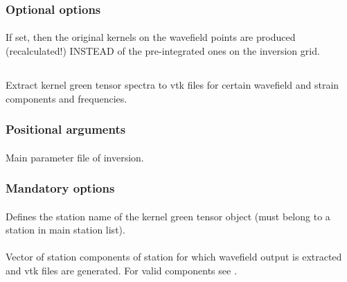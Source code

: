 \subsubsection{Optional options}
\paragraph{}
If set, then the original kernels on the wavefield points are produced (recalculated!) INSTEAD of the pre-integrated ones on the inversion grid.
%
%
\subsection{} \label{programs_scripts,sec:bin_prog,sec:kgt_2_vtk}
Extract kernel green tensor spectra to vtk files for certain wavefield and strain components and frequencies.
\subsubsection{Positional arguments}
\paragraph{}
Main parameter file of inversion.
\subsubsection{Mandatory options}
\paragraph{ }
Defines the station name of the kernel green tensor object (must belong to a station in main station list).
\paragraph{ }
Vector of  station components of station  for which wavefield output is
extracted and vtk files are generated. 
For valid components see .
